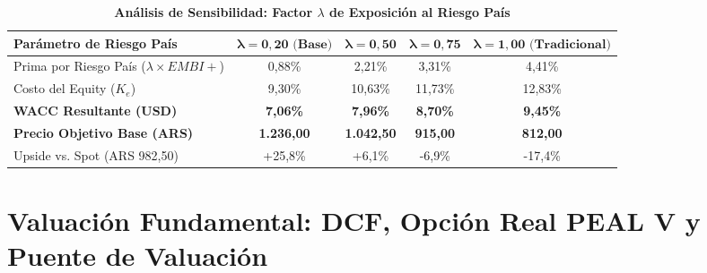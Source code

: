 \documentclass[10pt,a4paper]{article}
\begin{document}
\begin{table}[H]
\centering
\caption{\textbf{Análisis de Sensibilidad: Factor $\lambda$ de Exposición al Riesgo País}}
\small
\begin{tabularx}{\textwidth}{Xcccc}
\toprule
\textbf{Parámetro de Riesgo País} & $\mathbf{\lambda = 0,20\text{ (Base)}}$ & $\mathbf{\lambda = 0,50}$ & $\mathbf{\lambda = 0,75}$ & $\mathbf{\lambda = 1,00\text{ (Tradicional)}}$ \\
\midrule
Prima por Riesgo País ($\lambda \times EMBI+$) & 0,88\% & 2,21\% & 3,31\% & 4,41\% \\
Costo del Equity ($K_e$) & 9,30\% & 10,63\% & 11,73\% & 12,83\% \\
\textbf{WACC Resultante (USD)} & \textbf{7,06\%} & \textbf{7,96\%} & \textbf{8,70\%} & \textbf{9,45\%} \\
\textbf{Precio Objetivo Base (ARS)} & \textbf{1.236,00} & \textbf{1.042,50} & \textbf{915,00} & \textbf{812,00} \\
Upside vs. Spot (ARS 982,50) & +25,8\% & +6,1\% & -6,9\% & -17,4\% \\
\bottomrule
\end{tabularx}
\end{table}

\section{Valuación Fundamental: DCF, Opción Real PEAL V y Puente de Valuación}
\end{document}
